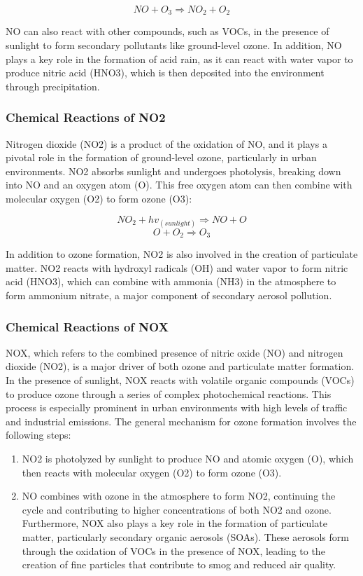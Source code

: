 \documentclass{modeleRapport}
\begin{document}
$$NO + O_3 \Rightarrow NO_2 + O_2$$

NO can also react with other compounds, such as VOCs, in the presence of sunlight to form secondary pollutants like 
ground-level ozone. In addition, NO plays a key role in the formation of acid rain, as it can react with water vapor 
to produce nitric acid (HNO3), which is then deposited into the environment through precipitation.\\

\subsubsection{Chemical Reactions of NO2}

Nitrogen dioxide (NO2) is a product of the oxidation of NO, and it plays a pivotal role in the formation of ground-level 
ozone, particularly in urban environments. NO2 absorbs sunlight and undergoes photolysis, breaking down into NO and an 
oxygen atom (O). This free oxygen atom can then combine with molecular oxygen (O2) to form ozone (O3):

$$NO_2 + hv_{(sunlight)} \Rightarrow NO+O$$
$$O+O_2 \Rightarrow O_3$$

In addition to ozone formation, NO2 is also involved in the creation of particulate matter. NO2 reacts with hydroxyl 
radicals (OH) and water vapor to form nitric acid (HNO3), which can combine with ammonia (NH3) in the atmosphere to form 
ammonium nitrate, a major component of secondary aerosol pollution.\\

\subsubsection{Chemical Reactions of NOX}

NOX, which refers to the combined presence of nitric oxide (NO) and nitrogen dioxide (NO2), is a major driver of both ozone 
and particulate matter formation. In the presence of sunlight, NOX reacts with volatile organic compounds (VOCs) to produce 
ozone through a series of complex photochemical reactions. This process is especially prominent in urban environments with 
high levels of traffic and industrial emissions. The general mechanism for ozone formation involves the following steps:
\begin{enumerate}
    \item NO2 is photolyzed by sunlight to produce NO and atomic oxygen (O), which then reacts with molecular oxygen (O2) 
    to form ozone (O3).
    \item NO combines with ozone in the atmosphere to form NO2, continuing the cycle and contributing to higher 
    concentrations of both NO2 and ozone. Furthermore, NOX also plays a key role in the formation of particulate matter, 
    particularly secondary organic aerosols (SOAs). These aerosols form through the oxidation of VOCs in the presence of NOX, 
    leading to the creation of fine particles that contribute to smog and reduced air quality.\\
\end{enumerate}
\end{document}
